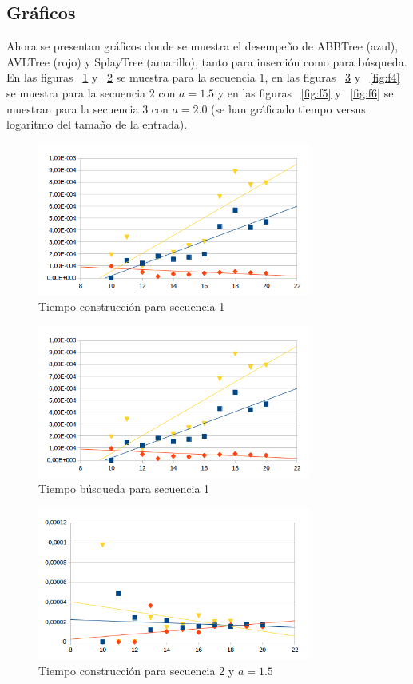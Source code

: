 \documentclass[letterpaper,12pt]{article}
\begin{document}
\newpage
\subsection{Gráficos}
Ahora se presentan gr\'aficos donde se muestra el desempeño de ABBTree (azul), AVLTree (rojo) y SplayTree (amarillo), tanto para inserci\'on como para b\'usqueda. En las figuras ~\ref{fig:f1} y ~\ref{fig:f2} se muestra para la secuencia $1$, en las figuras ~\ref{fig:f3} y ~\ref{fig:f4} se muestra para la secuencia $2$ con $a=1.5$ y en las figuras ~\ref{fig:f5} y ~\ref{fig:f6} se muestran para la secuencia $3$ con $a=2.0$ (se han gráficado tiempo versus logaritmo del tamaño de la entrada).


\iftrue
\begin{figure}[bp!]
  \centering
    \includegraphics[width=0.8\textwidth]{freq1_ins}
  \caption{Tiempo construcción para secuencia 1}
  \label{fig:f1}
\end{figure}

\begin{figure}[bp!]
  \centering
    \includegraphics[width=0.8\textwidth]{freq1_busq}
  \caption{Tiempo b\'usqueda para secuencia 1}
  \label{fig:f2}
\end{figure}

\begin{figure}[bp!]
  \centering
    \includegraphics[width=0.8\textwidth]{freq215_ins}
  \caption{Tiempo construcción para secuencia 2 y $a=1.5$}
  \label{fig:f3}
\end{figure}
\end{document}

